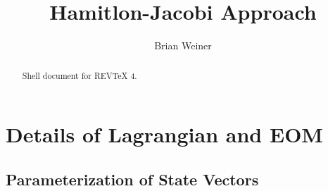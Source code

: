 \documentclass[aps,preprint]{revtex4}
\begin{document}
\title[HamJac]{Hamitlon-Jacobi Approach}
\author{Brian Weiner}
\pacs{}

\begin{abstract}
Shell document for REV\TeX{} 4.
\end{abstract}

\maketitle
\tableofcontents

\section{ Details of Lagrangian and EOM}

\subsection{Parameterization of State Vectors}
\end{document}
